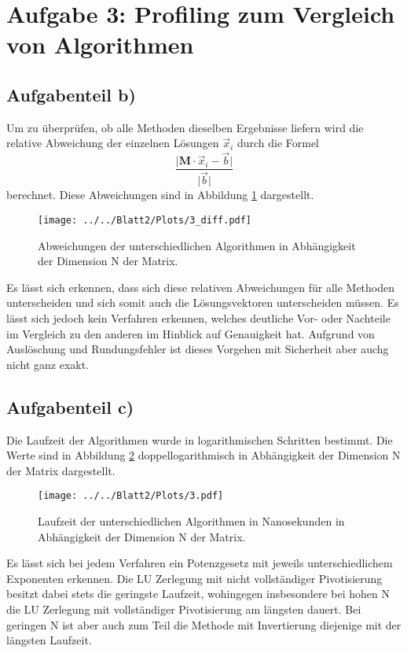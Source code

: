 \section*{Aufgabe 3: Profiling zum Vergleich von Algorithmen}


\subsection*{Aufgabenteil b)}
Um zu überprüfen, ob alle Methoden dieselben Ergebnisse liefern wird die relative Abweichung der einzelnen Lösungen $\vec{x}_i$ durch die Formel
\begin{equation}
  \frac{\lvert \symbf{M}\cdot \vec{x}_i-\vec{b} \rvert}{\lvert \vec{b} \rvert}
\end{equation}
berechnet. Diese Abweichungen sind in Abbildung \ref{fig:abw} dargestellt.
\begin{figure}[H]
  \centering
  \texttt{[image: ../../Blatt2/Plots/3\_diff.pdf]}
  \caption{Abweichungen der unterschiedlichen Algorithmen in Abhängigkeit der Dimension N der Matrix.}
  \label{fig:abw}
\end{figure}
Es lässt sich erkennen, dass sich diese relativen Abweichungen für alle Methoden unterscheiden und sich somit auch die Lösungsvektoren unterscheiden müssen. Es lässt sich jedoch kein Verfahren erkennen, welches
deutliche Vor- oder Nachteile im Vergleich zu den anderen im Hinblick auf Genauigkeit hat. Aufgrund von Auslöschung und Rundungsfehler ist dieses Vorgehen mit Sicherheit aber auchg nicht ganz exakt.


\subsection*{Aufgabenteil c)}
Die Laufzeit der Algorithmen wurde in logarithmischen Schritten bestimmt. Die Werte sind in Abbildung \ref{fig:laufzeit} doppellogarithmisch in Abhängigkeit der Dimension N der Matrix dargestellt.
\begin{figure}[H]
  \centering
  \texttt{[image: ../../Blatt2/Plots/3.pdf]}
  \caption{Laufzeit der unterschiedlichen Algorithmen in Nanosekunden in Abhängigkeit der Dimension N der Matrix.}
  \label{fig:laufzeit}
\end{figure}
Es lässt sich bei jedem Verfahren ein Potenzgesetz mit jeweils unterschiedlichem Exponenten erkennen.
Die LU Zerlegung mit nicht vollständiger Pivotisierung besitzt dabei stets die geringste Laufzeit, wohingegen insbesondere bei hohen N die LU Zerlegung mit vollständiger Pivotisierung am längsten dauert. Bei geringen N ist aber auch zum Teil die Methode mit Invertierung diejenige mit der längsten Laufzeit.

